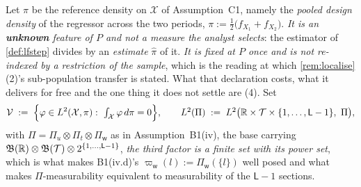 \begin{definition}\label{def:spaces}
Let $\pi$ be the reference density on $\mathcal X$ of Assumption~C1, namely the \emph{pooled design
density} of the regressor across the two periods,
$\pi:=\tfrac12\big(f_{X_1}+f_{X_2}\big)$.
\emph{It is an \textbf{unknown} feature of $P$ and not a measure the analyst selects}: the estimator of
\cref{def:lfstep} divides by an \emph{estimate} $\hat\pi$ of it. \emph{It is fixed at $P$ once and is
not re-indexed by a restriction of the sample}, which is the reading at which
\cref{rem:localise}\textup{(2)}'s sub-population transfer is stated. What that declaration costs, what
it delivers for free and the one thing it does not settle are
\textup{(4)}.
Set
\[
\mathcal V\;:=\;\Big\{\varphi\in L^{2}(\mathcal X,\pi):\ \textstyle\int_{\mathcal X}\varphi\,d\pi=0\Big\},
\qquad
L^{2}(\Pi)\;:=\;L^{2}\big(\mathbb{R}\times\mathcal T\times\{1,\dots,\mathsf L-1\},\ \Pi\big),
\]
with $\Pi=\Pi_u\otimes\Pi_t\otimes\Pi_{\mathsf w}$ as in Assumption~B1(iv), the base carrying
$\mathfrak B(\mathbb{R})\otimes\mathfrak B(\mathcal T)\otimes2^{\{1,\dots,\mathsf L-1\}}$, \emph{the third
factor is a finite set with its power set}, which is what makes B1(iv.d)'s
$\varpi_{\mathsf w}(l):=\Pi_{\mathsf w}(\{l\})$ well posed and what makes $\Pi$-measurability equivalent
to measurability of the $\mathsf L-1$ sections.

\end{definition}
